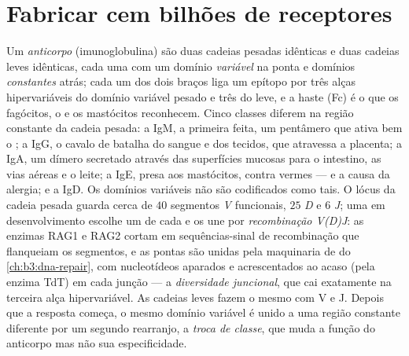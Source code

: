 \section{Fabricar cem bilhões de receptores}

\begin{definition}\label{def:b3:adaptive-immunity:antibody}
Um \emph{anticorpo} (imunoglobulina) são duas cadeias pesadas idênticas
e duas cadeias leves idênticas, cada uma com um domínio \emph{variável}
na ponta e domínios \emph{constantes} atrás; cada um dos dois braços
liga um epítopo por três alças hipervariáveis do domínio variável
pesado e três do leve, e a haste (Fc) é o que os fagócitos, o
 e os mastócitos reconhecem. Cinco classes diferem na região
constante da cadeia pesada: a IgM, a primeira feita, um pentâmero que
ativa bem o ; a IgG, o cavalo de batalha do sangue e dos
tecidos, que atravessa a placenta; a IgA, um dímero secretado através
das superfícies mucosas para o intestino, as vias aéreas e o leite; a
IgE, presa aos mastócitos, contra vermes --- e a causa da alergia; e a
IgD. Os domínios variáveis não são codificados como tais. O lócus da
cadeia pesada guarda cerca de $40$ segmentos \emph{V} funcionais, $25$
\emph{D} e $6$ \emph{J}; uma  em desenvolvimento escolhe um de
cada e os une por \emph{recombinação V(D)J}: as enzimas RAG1 e RAG2
cortam em sequências-sinal de recombinação que flanqueiam os segmentos,
e as pontas são unidas pela maquinaria de  do \cref{ch:b3:dna-repair}, com nucleotídeos aparados e
acrescentados ao acaso (pela enzima TdT) em cada junção --- a
\emph{diversidade juncional}, que cai exatamente na terceira alça
hipervariável. As cadeias leves fazem o mesmo com V e J. Depois que a
resposta começa, o mesmo domínio variável é unido a uma região
constante diferente por um segundo rearranjo, a \emph{troca de classe},
que muda a função do anticorpo mas não sua especificidade.
\end{definition}

